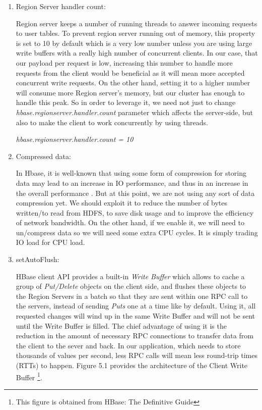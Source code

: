 \begin{enumerate}
\item{Region Server handler count:}
\par
Region server keeps a number of running threads to answer incoming requests to user tables. To prevent region server running out of memory, this property is set to 10 by default which is a very low number unless you are using large write buffers with a really high number of concurrent clients. In our case, that our payload per request is low, increasing this number to handle more requests from the client would be beneficial as it will mean more accepted concurrent write requests. On the other hand, setting it to a higher number will consume more Region server's memory, but our cluster has enough to handle this peak. So in order to leverage it, we need not just to change \textit{hbase.regionserver.handler.count} parameter which affects the server-side, but also to make the client to work concurrently by using threads.

\bigskip

\centerline{\textit{hbase.regionserver.handler.count = 10}}
\bigskip
\item Compressed data:
\par
In Hbase, it is well-known that using some form of compression for storing data may lead to an increase in IO performance, and thus in an increase in the overall performance \cite{raichand2013short} \cite{cheng2013key} \cite{aiyer2012storage} \cite{ApacheHBaseCompression}. But at this point, we are not using any sort of data compression yet. We should exploit it to reduce the number of bytes written/to read from HDFS, to save disk usage and to improve the efficiency of network bandwidth. On the other hand, if we enable it, we will need to un/compress data so we will need some extra CPU cycles. It is simply trading IO load for CPU load.

 \bigskip

\item setAutoFlush:
\par
HBase client API provides a built-in \textit{Write Buffer} which allows to cache a group of \textit{Put/Delete} objects on the client side, and flushes these objects to the Region Servers in a batch so that they are sent within one RPC call to the servers, instead of sending \textit{Puts} one at a time like by default. Using it, all requested changes will wind up in the same Write Buffer and will not be sent until the Write Buffer is filled. The chief advantage of using it is the reduction in the amount of necessary RPC connections to transfer data from the client to the sever and back. In our application, which needs to store thousands of values per second, less RPC calls will mean less round-trip times (RTTs) to happen. Figure 5.1 provides the architecture of the Client Write Buffer \footnote{This figure is obtained from HBase: The Definitive Guide}.


\end{enumerate}
